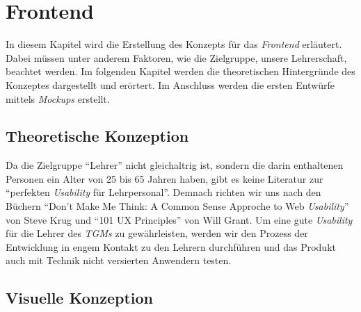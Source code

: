\section{Frontend}
\label{chapter:konzept-frontend}
In diesem Kapitel wird die Erstellung des Konzepts für das \textit{Frontend} erläutert. Dabei müssen unter anderem Faktoren, wie die Zielgruppe, unsere Lehrerschaft, beachtet werden. Im folgenden Kapitel werden die theoretischen Hintergründe des Konzeptes dargestellt und erörtert. Im Anschluss werden die ersten Entwürfe mittels \textit{Mockups} erstellt. 
\subsection{Theoretische Konzeption}
\label{chapter:konzept-frontend-theorie}
Da die Zielgruppe \enquote{Lehrer} nicht gleichaltrig ist, sondern die darin enthaltenen Personen ein Alter von 25 bis 65 Jahren haben, gibt es keine Literatur zur \enquote{perfekten \textit{Usability} für Lehrpersonal}. Demnach richten wir uns nach den Büchern \enquote{Don't Make Me Think: A Common Sense Approche to Web \textit{Usability}} von Steve Krug und  \enquote{101 UX Principles} von Will Grant. Um eine gute \textit{Usability} für die Lehrer des \textit{TGMs} zu gewährleisten, werden wir den Prozess der Entwicklung in engem Kontakt zu den Lehrern durchführen und das Produkt auch mit Technik nicht versierten Anwendern testen.  
\newpage
\subsection{Visuelle Konzeption}
\label{chapter:konzept-frontend-visuell}
